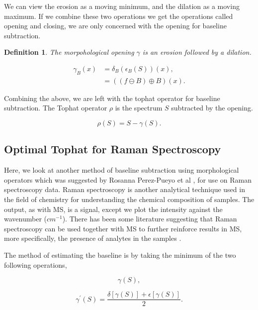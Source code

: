 \documentclass[11pt,openany]{book}
\newtheorem{definition}{Definition}
\begin{document}
We can view the erosion as a moving minimum, and the dilation as a moving maximum. If we combine these two operations we get the operations called opening and closing, we are only concerned with the opening for baseline subtraction.

\begin{definition}
    The morpohological opening $\gamma$ is an erosion followed by a dilation. 
    
    \begin{align}
        \gamma_{B} (x)      &= \delta_B(\epsilon_B(S))(x),\\
                            &= ((f \ominus B) \oplus B ) (x).
    \end{align}
\end{definition}

Combining the above, we are left with the tophat operator for baseline subtraction. The Tophat operator $\rho$ is the spectrum $S$ subtracted by the opening.

\begin{equation}
    \rho (S) = S - \gamma(S).
\end{equation}

\subsection{Optimal Tophat for Raman Spectroscopy}
Here, we look at another method of baseline subtraction using morphological operators which was suggested by Rosanna Perez-Pueyo et al \cite{baseline_raman_morphology_optimal_tophat}, for use on Raman spectroscopy data. Raman spectroscopy is another analytical technique used in the field of chemistry for understanding the chemical composition of samples. The output, as with MS, is a signal, except we plot the intensity against the wavenumber ($cm^{-1}$). There has been some literature suggesting that Raman spectroscopy can be used together with MS to further reinforce results in MS, more specifically, the presence of analytes in the samples \cite{combine_raman_spectroscopy_ms}.

The method of estimating the baseline is by taking the minimum of the two following operations,

\noindent\begin{minipage}{.5\linewidth}
    \begin{equation}
        \gamma (S),
    \end{equation}
    \end{minipage}
    \begin{minipage}{.5\linewidth}
    \begin{equation}
        \gamma^{'} (S) = \frac{ \delta[\gamma(S)] + \epsilon[\gamma(S)] }{ 2 }.
    \end{equation}
\end{minipage}
\end{document}
